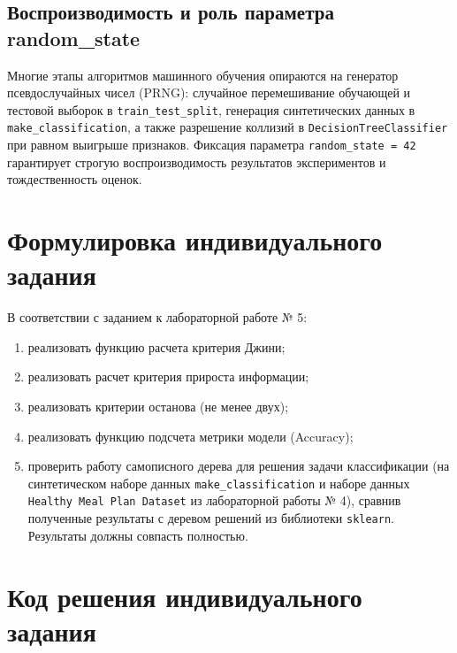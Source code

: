 \documentclass[14pt,a4paper]{extarticle}
\begin{document}
\subsection{Воспроизводимость и роль параметра random\_state}
Многие этапы алгоритмов машинного обучения опираются на генератор псевдослучайных чисел (PRNG): случайное перемешивание обучающей и тестовой выборок в \texttt{train\_test\_split}, генерация синтетических данных в \texttt{make\_classification}, а также разрешение коллизий в \texttt{DecisionTreeClassifier} при равном выигрыше признаков. Фиксация параметра \texttt{random\_state = 42} гарантирует строгую воспроизводимость результатов экспериментов и тождественность оценок.

\section{Формулировка индивидуального задания}

В соответствии с заданием к лабораторной работе № 5:
\begin{enumerate}
    \item реализовать функцию расчета критерия Джини;
    \item реализовать расчет критерия прироста информации;
    \item реализовать критерии останова (не менее двух);
    \item реализовать функцию подсчета метрики модели (Accuracy);
    \item проверить работу самописного дерева для решения задачи классификации (на синтетическом наборе данных \texttt{make\_classification} и наборе данных \texttt{Healthy Meal Plan Dataset} из лабораторной работы № 4), сравнив полученные результаты с деревом решений из библиотеки \texttt{sklearn}. Результаты должны совпасть полностью.
\end{enumerate}

\section{Код решения индивидуального задания}
\end{document}
